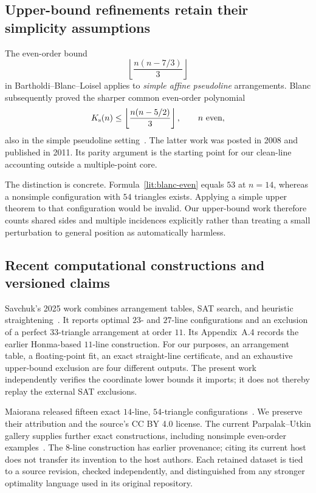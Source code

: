 \subsection{Upper-bound refinements retain their simplicity assumptions}

The even-order bound
\[
 \left\lfloor\frac{n(n-7/3)}3\right\rfloor
\]
in Bartholdi--Blanc--Loisel applies to \emph{simple affine pseudoline} arrangements. Blanc subsequently proved the sharper common even-order polynomial
\begin{equation}
 K_{\mathrm{s}}(n)\le\left\lfloor\frac{n(n-5/2)}3\right\rfloor,
 \qquad n\text{ even},
 \label{lit:blanc-even}
\end{equation}
also in the simple pseudoline setting~\citep{blanc2011}. The latter work was posted in 2008 and published in 2011. Its parity argument is the starting point for our clean-line accounting outside a multiple-point core.

The distinction is concrete. Formula~\eqref{lit:blanc-even} equals $53$ at $n=14$, whereas a nonsimple configuration with $54$ triangles exists. Applying a simple upper theorem to that configuration would be invalid. Our upper-bound work therefore counts shared sides and multiple incidences explicitly rather than treating a small perturbation to general position as automatically harmless.

\subsection{Recent computational constructions and versioned claims}

Savchuk's 2025 work combines arrangement tables, SAT search, and heuristic straightening~\citep{savchuk2025}. It reports optimal $23$- and $27$-line configurations and an exclusion of a perfect $33$-triangle arrangement at order $11$. Its Appendix~A.4 records the earlier Honma-based $11$-line construction. For our purposes, an arrangement table, a floating-point fit, an exact straight-line certificate, and an exhaustive upper-bound exclusion are four different outputs. The present work independently verifies the coordinate lower bounds it imports; it does not thereby replay the external SAT exclusions.

Maiorana released fifteen exact $14$-line, $54$-triangle configurations~\citep{maiorana2026}. We preserve their attribution and the source's CC BY 4.0 license. The current Parpalak--Utkin gallery supplies further exact constructions, including nonsimple even-order examples~\citep{parpalakutkinGallery2026}. The $8$-line construction has earlier provenance; citing its current host does not transfer its invention to the host authors. Each retained dataset is tied to a source revision, checked independently, and distinguished from any stronger optimality language used in its original repository.


